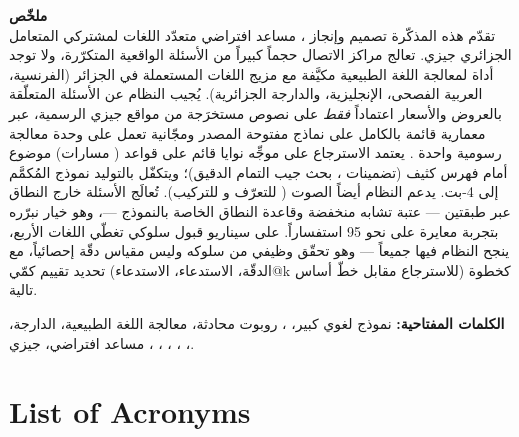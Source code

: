 \documentclass[12pt, a4paper]{report}
\begin{document}
\begin{Arabic}
\textbf{ملخّص}\\[0.3cm]
تقدّم هذه المذكّرة تصميم وإنجاز ، مساعد افتراضي متعدّد اللغات لمشتركي المتعامل الجزائري جيزي.
تعالج مراكز الاتصال حجماً كبيراً من الأسئلة الواقعية المتكرّرة، ولا توجد أداة لمعالجة اللغة الطبيعية مكيَّفة مع
مزيج اللغات المستعملة في الجزائر (الفرنسية، العربية الفصحى، الإنجليزية، والدارجة الجزائرية). يُجيب النظام عن
الأسئلة المتعلّقة بالعروض والأسعار اعتماداً \emph{فقط} على نصوص مستخرَجة من مواقع جيزي الرسمية، عبر معمارية
 قائمة بالكامل على نماذج مفتوحة المصدر ومجّانية تعمل على وحدة معالجة رسومية واحدة .
يعتمد الاسترجاع على موجِّه نوايا قائم على قواعد (\numRoutes{} مسارات) موضوع أمام فهرس كثيف 
(تضمينات ، بحث جيب التمام الدقيق)؛ ويتكفّل بالتوليد نموذج  المُكمَّم إلى 4-بت.
يدعم النظام أيضاً الصوت ( للتعرّف و للتركيب). تُعالَج الأسئلة خارج النطاق عبر طبقتين
--- عتبة تشابه منخفضة وقاعدة النطاق الخاصة بالنموذج ---، وهو خيار نبرّره بتجربة معايرة على نحو 95 استفساراً.
على \numTestsTotal{} سيناريو قبول سلوكي تغطّي اللغات الأربع، ينجح النظام فيها جميعاً --- وهو تحقّق وظيفي من سلوكه وليس مقياس دقّة إحصائياً، مع تحديد تقييم كمّي (الدقّة، الاستدعاء، الاستدعاء@k للاسترجاع مقابل خطّ أساس) كخطوة تالية.

{\textbf{الكلمات المفتاحية:}} نموذج لغوي كبير، ، روبوت محادثة، معالجة اللغة الطبيعية، الدارجة، ، ، ، ، ، مساعد افتراضي، جيزي.
\end{Arabic}

\newpage

\tableofcontents

\clearpage
{}
\listoffigures

\clearpage
{}
\listoftables

\clearpage
{}
\chapter*{List of Acronyms}
\end{document}
